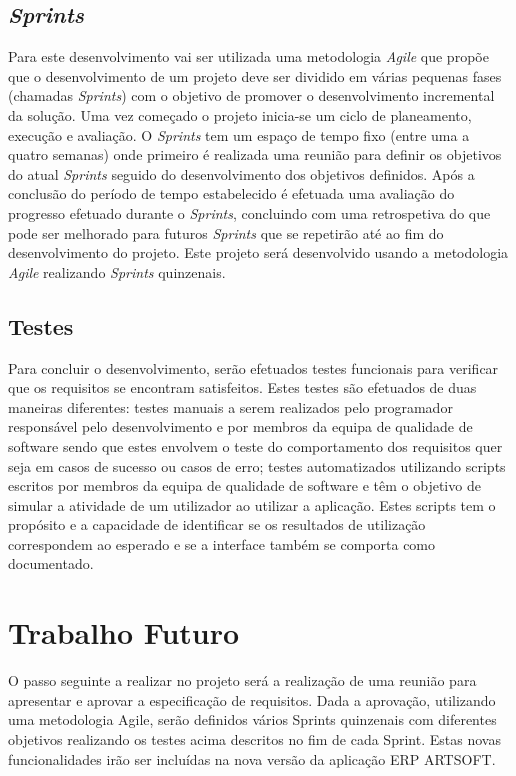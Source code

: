 \documentclass[sigplan]{acmart}
\begin{document}
\subsection{\textit{Sprints}}

Para este desenvolvimento vai ser utilizada uma metodologia \textit{Agile} que propõe que o desenvolvimento de um projeto deve ser dividido em várias pequenas fases (chamadas \textit{Sprints}) com o objetivo de promover o desenvolvimento incremental da solução. Uma vez começado o projeto inicia-se um ciclo de planeamento, execução e avaliação. O \textit{Sprints} tem um espaço de tempo fixo (entre uma a quatro semanas) onde primeiro é realizada uma reunião para definir os objetivos do atual \textit{Sprints} seguido do desenvolvimento dos objetivos definidos. Após a conclusão do período de tempo estabelecido é efetuada uma avaliação do progresso efetuado durante o \textit{Sprints}, concluindo com uma retrospetiva do que pode ser melhorado para futuros \textit{Sprints} que se repetirão até ao fim do desenvolvimento do projeto. Este projeto será desenvolvido usando a metodologia \textit{Agile} realizando \textit{Sprints} quinzenais.

\subsection{Testes}

Para concluir o desenvolvimento, serão efetuados testes funcionais para verificar que os requisitos se encontram satisfeitos. Estes testes são efetuados de duas maneiras diferentes: testes manuais a serem realizados pelo programador responsável pelo desenvolvimento e por membros da equipa de qualidade de software sendo que estes envolvem o teste do comportamento dos requisitos quer seja em casos de sucesso ou casos de erro; testes automatizados utilizando scripts escritos por membros da equipa de qualidade de software e têm o objetivo de simular a atividade de um utilizador ao utilizar a aplicação. Estes scripts tem o propósito e a capacidade de identificar se os resultados de utilização correspondem ao esperado e se a interface também se comporta como documentado.

\section{Trabalho Futuro} \label{sec:forthcomingwork}

O passo seguinte a realizar no projeto será a realização de uma reunião para apresentar e aprovar a especificação de requisitos. Dada a aprovação, utilizando uma metodologia Agile, serão definidos vários Sprints quinzenais com diferentes objetivos realizando os testes acima descritos no fim de cada Sprint. Estas novas funcionalidades irão ser incluídas na nova versão da aplicação ERP ARTSOFT.



\end{document}
